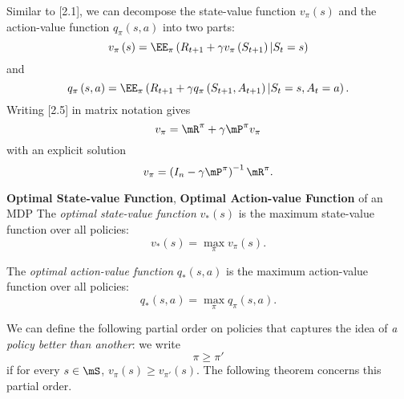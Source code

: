 \documentclass[RL]{subfiles}
\begin{document}
    \np Similar to [2.1], we can decompose the state-value function $v_{\pi}\left( s \right)$ and the action-value function $q_{\pi}\left( s,a \right)$ into two parts:
    \begin{equation}
        v_{\pi}\left( s \right) = \EE_{\pi}\left( R_{t+1}+\gamma v_{\pi}\left( S_{t+1} \right) | S_t=s \right)
    \end{equation}
    and
    \begin{equation}
        q_{\pi}\left( s,a \right) = \EE_{\pi}\left( R_{t+1}+\gamma q_{\pi}\left( S_{t+1},A_{t+1} \right)|S_t=s,A_t=a \right).
    \end{equation}
    Writing [2.5] in matrix notation gives
    \begin{equation}
        v_{\pi} = \mR^{\pi} + \gamma\mP^{\pi}v_{\pi}
    \end{equation}
    with an explicit solution
    \begin{equation}
        v_{\pi} = \left( I_n-\gamma\mP^{\pi} \right)^{-1}\mR^{\pi}.
    \end{equation}

    \begin{definition}{\textbf{Optimal State-value Function}, \textbf{Optimal Action-value Function} of an MDP}
        The \emph{optimal state-value function} $v_{*}\left( s \right)$ is the maximum state-value function over all policies:
        \begin{equation*}
            v_{*}\left( s \right) = \max_{\pi} v_{\pi}\left( s \right).
        \end{equation*}

        The \emph{optimal action-value function} $q_{*}\left( s,a \right)$ is the maximum action-value function over all policies:
        \begin{equation*}
            q_{*}\left( s,a \right) = \max_{\pi} q_{\pi}\left( s,a \right).
        \end{equation*}
    \end{definition}

    \np We can define the following partial order on policies that captures the idea of \textit{a policy better than another}: we write
    \begin{equation*}
        \pi\geq\pi' 
    \end{equation*}
    if for every $s\in\mS$, $v_{\pi}\left( s \right)\geq v_{\pi'}\left( s \right)$. The following theorem concerns this partial order.
\end{document}
